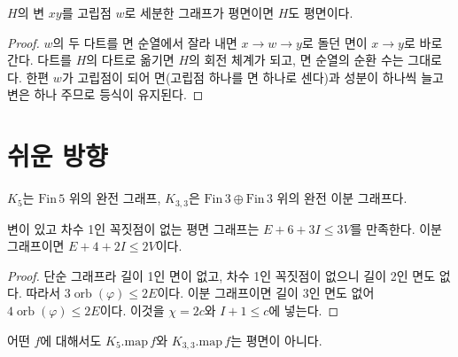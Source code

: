 \begin{theorem}[세분 되돌리기]
\label{thm:smooth}
\leanok
{}
\(H\)의 변 \(xy\)를 고립점 \(w\)로 세분한 그래프가 평면이면 \(H\)도 평면이다.
\end{theorem}

\begin{proof}
\leanok
{}
\(w\)의 두 다트를 면 순열에서 잘라 내면 \(x \to w \to y\)로 돌던 면이 \(x \to y\)로 바로 간다. 다트를
\(H\)의 다트로 옮기면 \(H\)의 회전 체계가 되고, 면 순열의 순환 수는 그대로다. 한편 \(w\)가 고립점이 되어
면(고립점 하나를 면 하나로 센다)과 성분이 하나씩 늘고 변은 하나 주므로 등식이 유지된다.
\end{proof}

\section{쉬운 방향}

\begin{definition}[\(K_5\)와 \(K_{3,3}\)]
\label{def:K5K33}
\leanok
\(K_5\)는 \(\mathrm{Fin}\,5\) 위의 완전 그래프, \(K_{3,3}\)은 \(\mathrm{Fin}\,3 \oplus \mathrm{Fin}\,3\) 위의
완전 이분 그래프다.
\end{definition}

\begin{lemma}[변 개수 상한]
\label{lem:edge_bound}
\leanok
{}
변이 있고 차수 1인 꼭짓점이 없는 평면 그래프는 \(E + 6 + 3I \le 3V\)를 만족한다. 이분 그래프이면
\(E + 4 + 2I \le 2V\)이다.
\end{lemma}

\begin{proof}
\leanok
{}
단순 그래프라 길이 1인 면이 없고, 차수 1인 꼭짓점이 없으니 길이 2인 면도 없다. 따라서
\(3\operatorname{orb}(\varphi) \le 2E\)이다. 이분 그래프이면 길이 3인 면도 없어
\(4\operatorname{orb}(\varphi) \le 2E\)이다. 이것을 \(\chi = 2c\)와 \(I + 1 \le c\)에 넣는다.
\end{proof}

\begin{theorem}
\label{thm:K5K33_nonplanar}
\leanok
{}
어떤 \(f\)에 대해서도 \(K_5.\mathrm{map}\,f\)와 \(K_{3,3}.\mathrm{map}\,f\)는 평면이 아니다.
\end{theorem}

